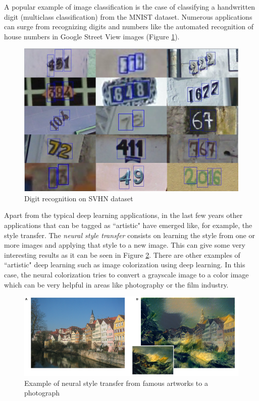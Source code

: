 A popular example of image classification is the case of classifying a handwritten digit (multiclass classification) from the MNIST dataset. Numerous applications can surge from recognizing digits and numbers like the automated recognition of house numbers in Google Street View images (Figure \ref{svhn}).
\begin{figure}[H]
\begin{center}
\includegraphics[scale=0.3]{figures/svhn.png}
\caption{Digit recognition on SVHN dataset \cite{netzer2011reading}}
\label{svhn}
\end{center}
\end{figure}
Apart from the typical deep learning applications, in the last few years other applications that can be tagged as ``artistic" have emerged like, for example, the style transfer. The \textit{neural style transfer} consists on learning the style from one or more images and applying that style to a new image. This can give some very interesting results as it can be seen in Figure \ref{style_transfer}. There are other examples of ``artistic" deep learning such as image colorization using deep learning. In this case, the neural colorization tries to convert a grayscale image to a color image which can be very helpful in areas like photography or the film industry.
\begin{figure}[H]
\begin{center}
\includegraphics[scale=0.4]{figures/style_transfer.png}
\caption{Example of neural style transfer from famous artworks to a photograph \cite{gatys2015neural}}
\label{style_transfer}
\end{center}
\end{figure}
